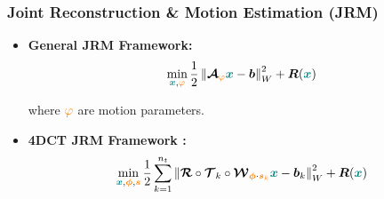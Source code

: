 \begin{frame}[t, fragile]
\frametitle{Joint Reconstruction \& Motion Estimation (JRM)}

    \begin{itemize}
    \item<1-> \textbf{General JRM Framework:}
              \begin{equation*}
              \min_{\textcolor{green}{\boldx},  \textcolor{orange}{\bold{\varphi}}} \frac{1}{2}\left\| \boldcalA_{\textcolor{orange}{\bold{\varphi}}} \textcolor{green}{\boldx} - \boldb \right\|_{W}^2 + \boldR(\textcolor{green}{\boldx})
            \end{equation*}

            where $\textcolor{orange}{\bold{\varphi}}$ are motion parameters.

      \item<2-> \textbf{4DCT JRM Framework \cite{huang2024resolving}:}
            \begin{equation*}
              \min_{\textcolor{green}{\boldx},  \textcolor{orange}{\boldphi}, \textcolor{orange}{\bolds}} \frac{1}{2}\sum_{k = 1}^{n_t}\left\| \boldcalR \circ \boldcalT_{k} \circ \boldcalW_{\textcolor{orange}{\boldphi} \cdot \textcolor{orange}{\bolds_k} } \textcolor{green}{\boldx} - \boldb_k \right\|_{W}^2 + \boldR(\textcolor{green}{\boldx})
            \end{equation*}


\end{itemize}
\end{frame}
